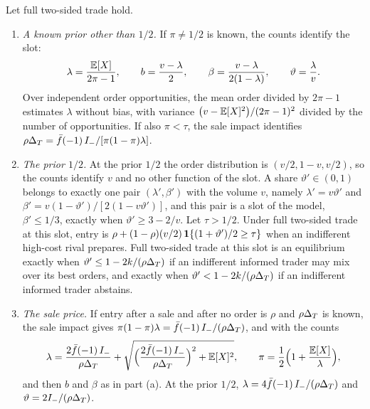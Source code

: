 \begin{proposition}\label{prop:informedshare}
Let full two-sided trade hold.
\begin{enumerate}[label=(\alph*),leftmargin=2em]
\item \emph{A known prior other than \(1/2\).} If \(\pi\ne1/2\) is known, the counts identify the slot:
\[
\lambda=\frac{\mathbb{E}[X]}{2\pi-1},\qquad b=\frac{v-\lambda}{2},\qquad \beta=\frac{v-\lambda}{2(1-\lambda)},\qquad
\vartheta=\frac{\lambda}{v}.
\]
Over independent order opportunities, the mean order divided by \(2\pi-1\) estimates \(\lambda\) without bias, with
variance \(\bigl(v-\mathbb{E}[X]^2\bigr)/(2\pi-1)^2\) divided by the number of opportunities. If also \(\pi<\tau\), the sale
impact identifies \(\rho\Delta_T=\bar f(-1)\,I_-/[\pi(1-\pi)\lambda]\).
\item \emph{The prior \(1/2\).} At the prior \(1/2\) the order distribution is \((v/2,1-v,v/2)\), so the counts identify \(v\) and
no other function of the slot. A share \(\vartheta'\in(0,1)\) belongs to exactly one pair \((\lambda',\beta')\) with
the volume \(v\), namely \(\lambda'=v\vartheta'\) and \(\beta'=v(1-\vartheta')/[2(1-v\vartheta')]\), and this pair is
a slot of the model, \(\beta'\le1/3\), exactly when \(\vartheta'\ge3-2/v\). Let \(\tau>1/2\). Under full two-sided
trade at this slot, entry is \(\rho+(1-\rho)(v/2)\,\mathbf{1}\{(1+\vartheta')/2\ge\tau\}\) when an indifferent high-cost
rival prepares. Full two-sided trade at this slot is an equilibrium exactly when
\(\vartheta'\le1-2k/(\rho\Delta_T)\) if an indifferent informed trader may mix over its best orders, and exactly when
\(\vartheta'<1-2k/(\rho\Delta_T)\) if an indifferent informed trader abstains.
\item \emph{The sale price.} If entry after a sale and after no order is \(\rho\) and \(\rho\Delta_T\) is known, the sale
impact gives \(\pi(1-\pi)\lambda=\bar f(-1)\,I_-/(\rho\Delta_T)\), and with the counts
\[
\lambda=\frac{2\bar f(-1)\,I_-}{\rho\Delta_T}+\sqrt{\Bigl(\frac{2\bar f(-1)\,I_-}{\rho\Delta_T}\Bigr)^2+\mathbb{E}[X]^2},\qquad
\pi=\frac12\Bigl(1+\frac{\mathbb{E}[X]}{\lambda}\Bigr),
\]
and then \(b\) and \(\beta\) as in part (a). At the prior \(1/2\), \(\lambda=4\bar f(-1)\,I_-/(\rho\Delta_T)\) and
\(\vartheta=2I_-/(\rho\Delta_T)\).
\end{enumerate}
\end{proposition}

